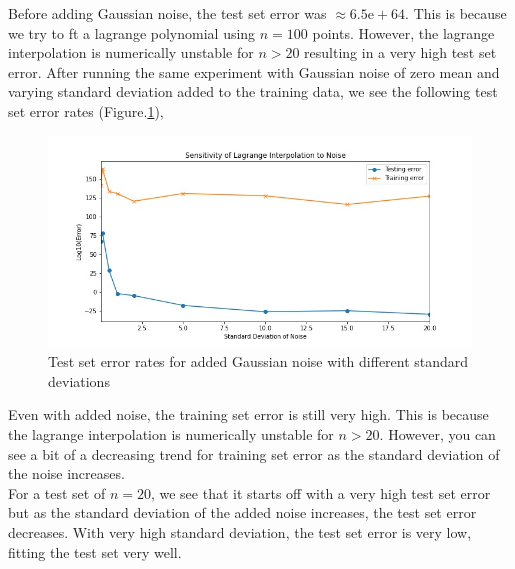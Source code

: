 \documentclass[a4paper]{article}
\theoremstyle{definition}
\newenvironment{soln}{
    \leavevmode\color{blue}\ignorespaces
}{}
\begin{document}
\begin{soln}
  Before adding Gaussian noise, the test set error was $\approx 6.5\mathrm{e}+64$. This is because we try to ft a lagrange polynomial using $n=100$ points. However, the lagrange interpolation is numerically unstable for $n>20$ resulting in a very high test set error. After running the same experiment with Gaussian noise of zero mean and varying standard deviation added to the training data, we see the following test set error rates (Figure.\ref{fig:q2_15}), \\

  \begin{figure}[H]
    \centering
    \includegraphics[width=12cm]{q4_err_plot.jpg}
    \caption{Test set error rates for added Gaussian noise with different standard deviations}
    \label{fig:q2_15}
  \end{figure}

  Even with added noise, the training set error is still very high. This is because the lagrange interpolation is numerically unstable for $n>20$. However, you can see a bit of a decreasing trend for training set error as the standard deviation of the noise increases. \\

  For a test set of $n=20$, we see that it starts off with a very high test set error but as the standard deviation of the added noise increases, the test set error decreases. With very high standard deviation, the test set error is very low, fitting the test set very well. \\
  
  
\end{soln}


\end{document}
